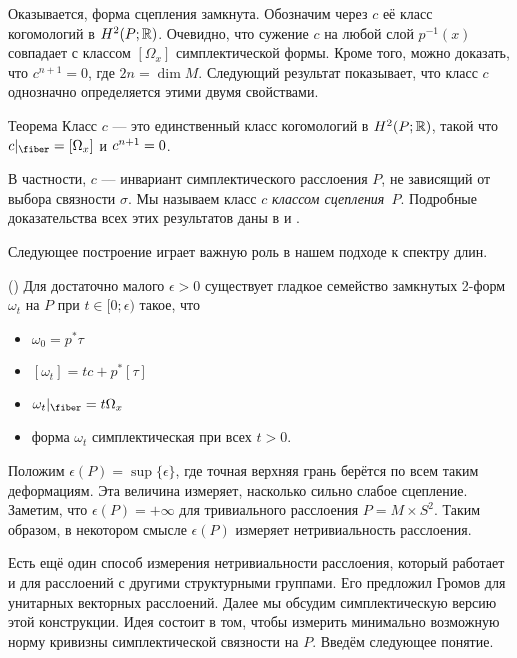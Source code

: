 Оказывается, форма сцепления замкнута.
Обозначим через $c$ её класс когомологий в $H^2 (P;\mathbb{R})$.
Очевидно, что сужение $c$ на любой слой $p^{-1}(x)$ совпадает с классом $[\Omega_x]$
симплектической формы.  
Кроме того, можно доказать, что $c^{n+1} = 0$, где $2n = \dim M$.
Следующий результат показывает, что класс $c$ однозначно определяется
этими двумя свойствами. 

\begin{thm}{Теорема}\label{9.3.A}
  Класс $c$ — это единственный класс когомологий в $H^2 (P;\mathbb{R})$,
  такой что $c|_{\fiber} = [\Omega_x]$ и $c^{n+1} \z= 0$.
\end{thm}

В частности, $c$ — инвариант симплектического расслоения $P$, не
зависящий от выбора связности $\sigma$. 
Мы называем класс $c$ \emph{классом сцепления}~$P$.
Подробные доказательства всех этих результатов даны в \cite{GLS} и \cite{MS}.

Следующее построение играет важную роль в нашем подходе к спектру длин.

(\cite{GLS,MS})
Для достаточно малого $\epsilon > 0$ существует гладкое семейство
замкнутых 2-форм $\omega_t$ на $P$ при $t \in [0;\epsilon)$ такое, что 
\begin{itemize}
\item $\omega_0 = p^\ast \tau$
\item $[\omega_t] = tc + p^\ast [\tau]$
\item $\omega_t|_{\fiber} = t\Omega_x$
\item форма $\omega_t$ симплектическая при всех $t > 0$.
\end{itemize}

Положим $\epsilon(P) = \sup \{\epsilon\}$,
где точная верхняя грань берётся по всем таким деформациям.  
Эта величина измеряет, насколько сильно слабое сцепление.
Заметим, что $\epsilon(P) = +\infty$ для тривиального расслоения $P = M \times S^2$.
Таким образом, в некотором смысле $\epsilon(P)$ измеряет нетривиальность расслоения.

Есть ещё один способ измерения нетривиальности расслоения, который
работает и для расслоений с другими структурными группами. 
Его предложил Громов \cite{G2} для унитарных векторных расслоений.
Далее мы обсудим симплектическую версию этой конструкции. 
Идея состоит в том, чтобы измерить минимально возможную норму кривизны
симплектической связности на $P$. 
Введём следующее понятие.

